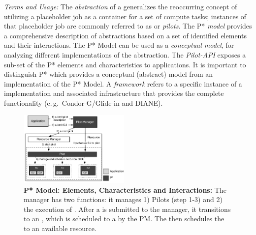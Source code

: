 \documentclass{sig-alternate}
\begin{document}
\emph{Terms and Usage:} The \emph{ abstraction} of a \pilotjob
generalizes the reoccurring concept of utilizing a placeholder job as a
container for a set of compute tasks; instances of that placeholder
job are commonly referred to as \emph{\pilotjobs} or
\emph{pilots}. The P* \emph{model} provides a %
comprehensive description of \pilotjob abstractions based on a set of
identified elements and their interactions. The P* Model can be used
as a {\it conceptual model}, for analyzing different implementations
of the \pilotjob abstraction. The \emph{Pilot-API} exposes a sub-set
of the P* elements and characteristics to applications. 
It is important to distinguish P* which provides a conceptual (abstract) model 
from an implementation of the P* Model. A \emph{\pilotjob framework} refers to a 
specific instance of a \pilotjob implementation and associated infrastructure 
that provides the complete \pilotjob functionality (e.\,g.\ Condor-G/Glide-in and
DIANE). 



\begin{figure}[t]
    \centering
    \includegraphics[width=0.48\textwidth]{figures/pstar_model_single.pdf}
    \caption{ \textbf{P* Model: Elements, Characteristics and
        Interactions:} The manager has two functions: it manages 1)
      Pilots (step 1-3) and 2) the execution of \cus. After a \cu is
      submitted to the manager, it transitions to an \su, which is
      scheduled to a \pilot by the PM. The \pilot then schedules the
      \su to an available resource.  }
    \label{fig:figures_pstar}
\end{figure}
\end{document}
